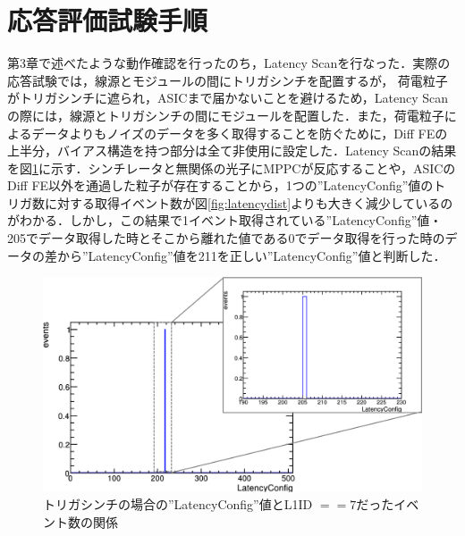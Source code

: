 \section{応答評価試験手順}
\label{sec:exthow}

第3章で述べたような動作確認を行ったのち，Latency Scanを行なった．実際の応答試験では，線源とモジュールの間にトリガシンチを配置するが， 荷電粒子がトリガシンチに遮られ，ASICまで届かないことを避けるため，Latency Scanの際には，線源とトリガシンチの間にモジュールを配置した．また，荷電粒子によるデータよりもノイズのデータを多く取得することを防ぐために，Diff FEの上半分，バイアス構造を持つ部分は全て非使用に設定した．Latency Scanの結果を図\ref{fig:exttriglatency}に示す．シンチレータと無関係の光子にMPPCが反応することや，ASICのDiff FE以外を通過した粒子が存在することから，1つの''LatencyConfig''値のトリガ数に対する取得イベント数が図\ref{fig:latencydist}よりも大きく減少しているのがわかる．しかし，この結果で1イベント取得されている''LatencyConfig''値・205でデータ取得した時とそこから離れた値である0でデータ取得を行った時のデータの差から''LatencyConfig''値を211を正しい''LatencyConfig''値と判断した．

\begin{figure}[h]
  \centering
  \includegraphics[width=14cm]{./figure/ExtLatencyDist.png}
  \caption{トリガシンチの場合の''LatencyConfig''値とL1ID $== 7$だったイベント数の関係}
  \label{fig:exttriglatency}
\end{figure}

